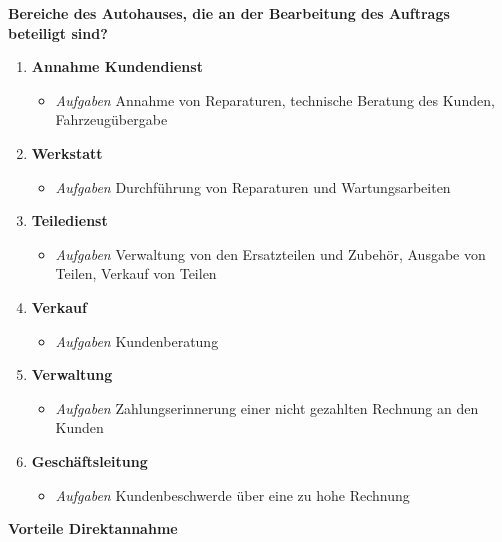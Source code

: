 \textbf{Bereiche des Autohauses, die an der Bearbeitung des Auftrags
beteiligt sind?}

\begin{enumerate}
\item
  \textbf{Annahme Kundendienst}

  \begin{itemize}
  \item
    \emph{Aufgaben} Annahme von Reparaturen, technische Beratung des
    Kunden, Fahrzeugübergabe
  \end{itemize}
\item
  \textbf{Werkstatt}

  \begin{itemize}
  \item
    \emph{Aufgaben} Durchführung von Reparaturen und Wartungsarbeiten
  \end{itemize}
\item
  \textbf{Teiledienst}

  \begin{itemize}
  \item
    \emph{Aufgaben} Verwaltung von den Ersatzteilen und Zubehör, Ausgabe
    von Teilen, Verkauf von Teilen
  \end{itemize}
\item
  \textbf{Verkauf}

  \begin{itemize}
  \item
    \emph{Aufgaben} Kundenberatung
  \end{itemize}
\item
  \textbf{Verwaltung}

  \begin{itemize}
  \item
    \emph{Aufgaben} Zahlungserinnerung einer nicht gezahlten Rechnung an
    den Kunden
  \end{itemize}
\item
  \textbf{Geschäftsleitung}

  \begin{itemize}
  \item
    \emph{Aufgaben} Kundenbeschwerde über eine zu hohe Rechnung
  \end{itemize}
\end{enumerate}

\textbf{Vorteile Direktannahme}

